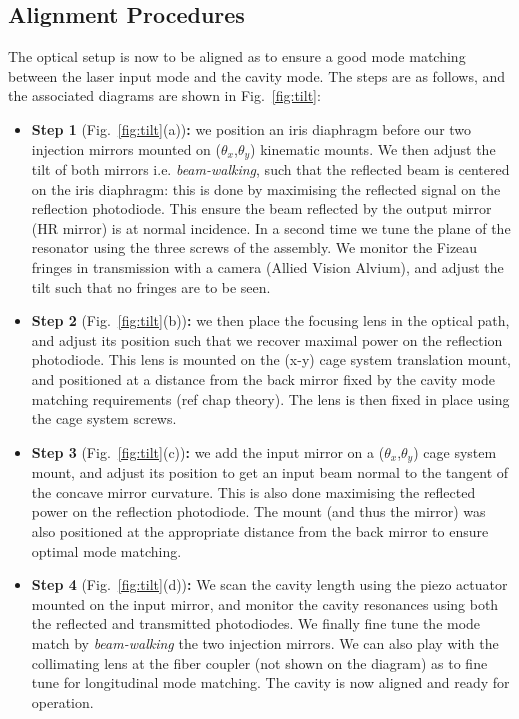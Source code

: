 \subsection{Alignment Procedures}
The optical setup is now to be aligned as to ensure a good mode matching between the laser input mode and the cavity mode. The steps are as follows, and the associated diagrams are shown in Fig.~\ref{fig:tilt}:
\begin{itemize}
  \item \textbf{Step 1} (Fig.~\ref{fig:tilt}(a))\textbf{:} we position an iris diaphragm before our two injection mirrors mounted on ($\theta_x$,$\theta_y$) kinematic mounts. We then adjust the tilt of both mirrors i.e. \textit{beam-walking}, such that the reflected beam is centered on the iris diaphragm: this is done by maximising the reflected signal on the reflection photodiode. This ensure the beam reflected by the output mirror (HR mirror) is at normal incidence. In a second time we tune the plane of the resonator using the three screws of the assembly. We monitor the Fizeau fringes in transmission with a camera (Allied Vision Alvium), and adjust the tilt such that no fringes are to be seen. 
  \item \textbf{Step 2} (Fig.~\ref{fig:tilt}(b))\textbf{:} we then place the focusing lens in the optical path, and adjust its position such that we recover maximal power on the reflection photodiode. This lens is mounted on the (x-y) cage system translation mount, and positioned at a distance from the back mirror fixed by the cavity mode matching requirements (ref chap theory). The lens is then fixed in place using the cage system screws.
  \item \textbf{Step 3} (Fig.~\ref{fig:tilt}(c))\textbf{:} we add the input mirror on a ($\theta_x$,$\theta_y$) cage system mount, and adjust its position to get an input beam normal to the tangent of the concave mirror curvature. This is also done maximising the reflected power on the reflection photodiode. The mount (and thus the mirror) was also positioned at the appropriate distance from the back mirror to ensure optimal mode matching. 
  \item \textbf{Step 4} (Fig.~\ref{fig:tilt}(d))\textbf{:} We scan the cavity length using the piezo actuator mounted on the input mirror, and monitor the cavity resonances using both the reflected and transmitted photodiodes. We finally fine tune the mode match by \textit{beam-walking} the two injection mirrors. We can also play with the collimating lens at the fiber coupler (not shown on the diagram) as to fine tune for longitudinal mode matching. The cavity is now aligned and ready for operation.
  \end{itemize}

